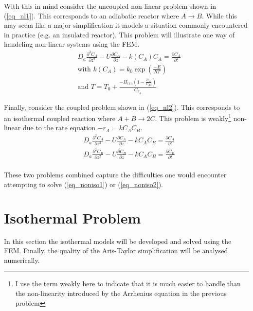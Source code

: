 \documentclass[11pt,fleqn]{article}
\theoremstyle{defstyle}
\begin{document}
With this in mind consider the uncoupled non-linear problem shown in (\ref{eq_nl1}). This corresponds to an adiabatic reactor where $A \rightarrow B$. While this may seem like a major simplification it models a situation commonly encountered in practice (e.g. an insulated reactor). This problem will illustrate one way of handeling non-linear systems using the FEM.
\begin{equation}
\begin{aligned}
&D_a \frac{\partial^2 C_A}{\partial z^2} - U \frac{\partial C_A}{\partial z} - k(C_A)
C_A = \frac{\partial C_A}{\partial t} \\
& \text{with }k(C_A) = k_0 \exp(\frac{-E}{RT}) \\
& \text{and } T = T_0 + \frac{-H_{rxn} (1-\frac{C_A}{C_{A0}})}{C_{p_A}}
\end{aligned}
\label{eq_nl1}
\end{equation}  

Finally, consider the coupled problem shown in (\ref{eq_nl2}). This corresponds to an isothermal coupled reaction where $A + B \rightarrow 2C$. This problem is weakly\footnote{I use the term weakly here to indicate that it is much easier to handle than the non-linearity introduced by the Arrhenius equation in the previous problem} non-linear due to the rate equation $-r_A = kC_AC_B$.
\begin{equation}
\begin{aligned}
&D_a \frac{\partial^2 C_A}{\partial z^2} - U \frac{\partial C_A}{\partial z} - kC_AC_B 
= \frac{\partial C_A}{\partial t} \\
&D_a \frac{\partial^2 C_B}{\partial z^2} - U \frac{\partial C_B}{\partial z} - kC_AC_B 
= \frac{\partial C_B}{\partial t} \\
\end{aligned}
\label{eq_nl2}
\end{equation}

These two problems combined capture the difficulties one would encounter attempting to solve (\ref{eq_noniso1}) or (\ref{eq_noniso2}).
\section{Isothermal Problem}
In this section the isothermal models will be developed and solved using the FEM. Finally, the quality of the Aris-Taylor simplification will be analysed numerically.  
\end{document}
